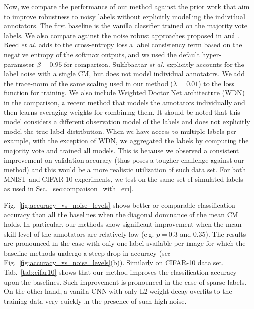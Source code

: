 \label{sec:other_baselines}
Now, we compare the performance of our method against the prior work that aim to improve robustness to noisy labels without explicitly modelling the individual annotators. The first baseline is the vanilla classifier trained on the majority vote labels. We also compare against the noise robust approaches proposed in \cite{reed2014training} and \cite{sukhbaatar2014training}. Reed \textit{et al.} \cite{reed2014training} adds to the cross-entropy loss a label consistency term based on the negative entropy of the softmax outputs, and we used the default hyper-parameter $\beta = 0.95$ for comparison. Sukhbaatar \textit{et al.} \cite{sukhbaatar2014training} explicitly accounts for the label noise with a single CM, but does not model individual annotators. We add the trace-norm of the same scaling used in our method ($\lambda=0.01$) to the loss function for training. We also include Weighted Doctor Net architecture (WDN) \cite{guan2017said} in the comparison, a recent method that models the annotators individually and then learns averaging weights for combining them. It should be noted that this model considers a different observation model of the labels and does not explicitly model the true label distribution. When we have access to multiple labels per example, with the exception of WDN, we aggregated the labels by computing the majority vote and trained all models. This is because we observed a consistent improvement on validation accuracy (thus poses a tougher challenge against our method) and this would be a more realistic utilization of such data set. For both MNIST and CIFAR-10 experiments, we test on the same set of simulated labels as used in Sec.~\ref{sec:comparison_with_em}. 

Fig.~\ref{fig:accuracy_vs_noise_levels} shows better or comparable classification accuracy than all the baselines when the diagonal dominance of the mean CM holds. In particular, our methods show significant improvement when the mean skill level of the annotators are relatively low (e.g. $p=0.3$ and $0.35$). The results are pronounced in the case with only one label available per image for which the baseline methods undergo a steep drop in accuracy (see Fig.~\ref{fig:accuracy_vs_noise_levels}(b)). Similarly on CIFAR-10 data set, Tab.~\ref{tab:cifar10} shows that our method improves the classification accuracy upon the baselines. Such improvement is pronounced in the case of sparse labels. On the other hand, a vanilla CNN with only L2 weight decay overfits to the training data very quickly in the presence of such high noise. 

